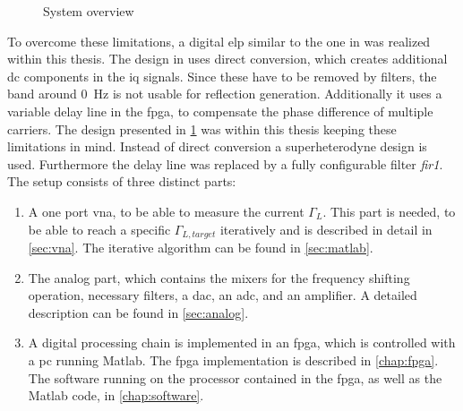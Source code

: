 \documentclass[12pt,a4paper,parskip=full,abstract=true,BCOR=12mm,twoside,open=right]{scrreprt}
\def\device#1{\textit{#1}}
\begin{document}
\begin{figure}[htb]
{
    }
    \caption{System overview}
    \label{fig:overall_hf}
\end{figure}

To overcome these limitations, a digital \gls{elp} similar to the one in
\cite{hashim_active_2008} was realized within this thesis. The design in \cite{hashim_active_2008}
uses direct conversion, which creates additional \gls{dc} components in the \gls{iq}
signals. Since these have to be removed by filters, the band around \SI{0}{\hertz} is
not usable for reflection generation. Additionally it uses a variable delay line in
the \gls{fpga}, to compensate the phase difference of multiple carriers. The design presented in
\cref{fig:overall_hf} was within this thesis keeping these limitations in mind. Instead of direct
conversion a superheterodyne design is used. Furthermore the delay line was replaced by
a fully configurable filter \device{fir1}. The setup consists of three distinct parts:

\begin{enumerate}
    \item A one port \gls{vna}, to be able to measure the current $\Gamma_L$. This part is
needed, to be able to reach a specific $\Gamma_{L,target}$ iteratively and is
described in detail in \cref{sec:vna}. The iterative algorithm can be found
in \cref{sec:matlab}.
    \item The analog part, which contains the mixers for the frequency shifting operation, necessary
        filters, a \gls{dac}, an \gls{adc}, and an amplifier. A detailed description can be found
        in \cref{sec:analog}.
    \item A digital processing chain is implemented in an \gls{fpga}, which is controlled with
a \gls{pc} running Matlab. The \gls{fpga} implementation is described in \cref{chap:fpga}.
The software running on the processor contained in the \gls{fpga}, as well as the Matlab
code, in \cref{chap:software}.
\end{enumerate}
\end{document}
